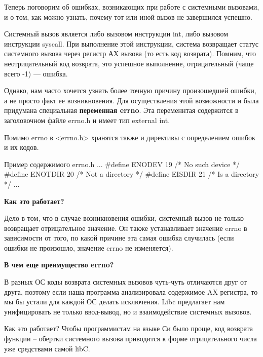 Теперь поговорим об ошибках, возникающих при работе с системными вызовами, и о том, как можно узнать, почему тот или иной вызов не завершился успешно.

Системный вызов является либо вызовом инструкции int, либо вызовом инструкции syscall. При выполнение этой инструкции, система возвращает статус системного вызова через регистр АХ вызова (то есть код возврата). Помним, что неотрицательный код возврата, это успешное выполнение, отрицательный (чаще всего -1) --- ошибка. 

Однако, нам часто хочется узнать более точную причину произошедшей ошибки, а не просто факт ее возникновения. Для осуществления этой возможности и была придумана специальная \textbf{переменная errno}. Эта переменнтая содержится в заголовочном файле errno.h и имеет тип external int.

Помимо errno в <errno.h> хранятся также и директивы с определением ошибок и их кодов.


\begin{CCode}{Пример содержимого errno.h}
	...
	#define ENODEV      19  /* No such device */
	#define ENOTDIR     20  /* Not a directory */
	#define EISDIR      21  /* Is a directory */ 
	... \end{CCode}

\textbf{Как это работает?}

Дело в том, что в случае возникновения ошибки, системный вызов не только возвращает отрицательное значение. Он также устанавливает значение errno в зависимости от того, по какой причине эта самая ошибка случилась (если ошибки не произошло, значение errno не изменяется). 

\textbf{В чем еще преимущество errno?}

В разных ОС коды возврата системных вызовов чуть-чуть отличаются друг от друга, поэтому если наша программа анализировала содержимое AX регистра, то мы бы устали для каждой ОС делать исключения. Libc предлагает нам унифицировать не только ввод-вывод, но и взаимодействие системных вызовов. 

Как это работает? Чтобы программистам на языке Си было проще, код возврата функции -- обертки системного вызова приводится к форме отрицательного числа уже средствами самой libC. 
